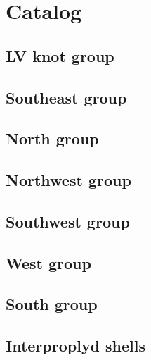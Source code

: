\documentclass{emulateapj}
\begin{document}
\section{Catalog}
\label{sec:catalog}

\subsection{LV knot group}
\label{sec:lv-group}



\clearpage
\subsection{Southeast group}
\label{sec:se-group}



\clearpage
\subsection{North group}
\label{sec:n-group}



\clearpage
\subsection{Northwest group}
\label{sec:nw-group}



\clearpage
\subsection{Southwest group}
\label{sec:sw-group}



\clearpage
\subsection{West group}
\label{sec:w-group}



\clearpage
\subsection{South group}
\label{sec:s-group}



\clearpage
\subsection{Interproplyd shells}
\label{sec:interproplyd-group}


\end{document}
